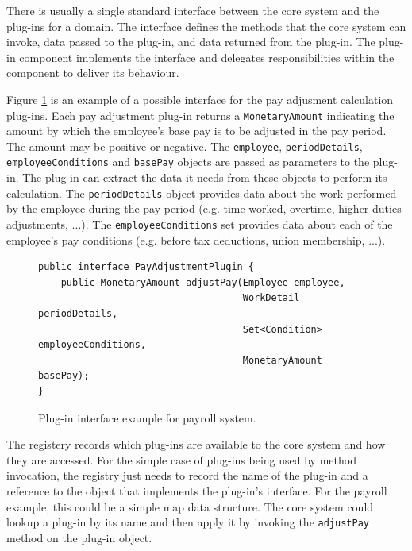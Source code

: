 There is usually a single standard interface between the core system and the plug-ins for a domain.
The interface defines the methods that the core system can invoke, data passed to the plug-in, and data returned from the plug-in.
The plug-in component implements the interface and delegates responsibilities within the component to deliver its behaviour.

Figure \ref{fig:interface} is an example of a possible interface for the pay adjusment calculation plug-ins.
Each pay adjustment plug-in returns a \texttt{MonetaryAmount} indicating the amount by which the employee's base pay is to be adjusted in the pay period.
The amount may be positive or negative.
The \texttt{employee}, \texttt{periodDetails}, \texttt{employeeConditions} and \texttt{basePay} objects are passed as parameters to the plug-in.
The plug-in can extract the data it needs from these objects to perform its calculation.
The \texttt{periodDetails} object provides data about the work performed by the employee during the pay period (e.g. time worked, overtime, higher duties adjustments, ...).
The \texttt{employeeConditions} set provides data about each of the employee's pay conditions (e.g. before tax deductions, union membership, ...).

\begin{figure}[ht]{\textwidth}
\centering
\begin{shaded}
\begin{lstlisting}[style=java]
public interface PayAdjustmentPlugin {
    public MonetaryAmount adjustPay(Employee employee,
                                    WorkDetail periodDetails,
                                    Set<Condition> employeeConditions,
                                    MonetaryAmount basePay);
}
\end{lstlisting}
\end{shaded}
\caption{Plug-in interface example for payroll system.}
\label{fig:interface}
\end{figure}

The registery records which plug-ins are available to the core system and how they are accessed.
For the simple case of plug-ins being used by method invocation,
the registry just needs to record the name of the plug-in and a reference to the object that implements the plug-in's interface.
For the payroll example, this could be a simple map data structure.
The core system could lookup a plug-in by its name and then apply it by invoking the \texttt{adjustPay} method on the plug-in object.

